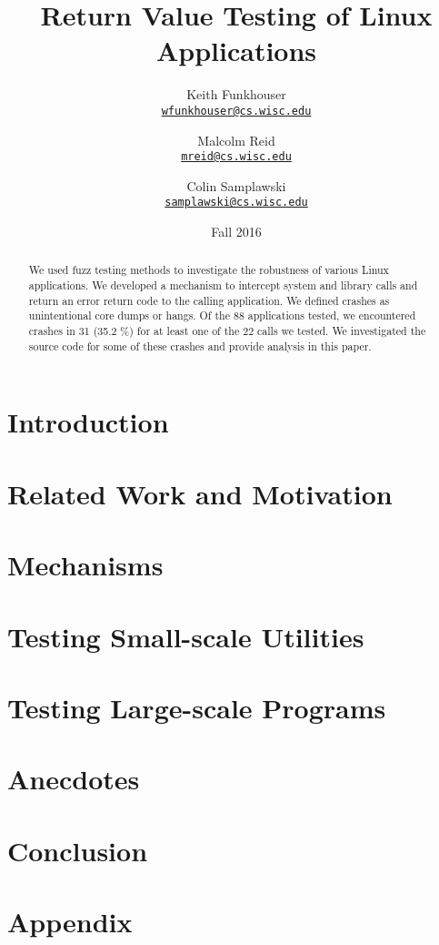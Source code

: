 \documentclass[10pt]{article}
\title{Return Value Testing of Linux Applications}
\author{Keith Funkhouser \\ \texttt{\href{mailto:wfunkhouser@cs.wisc.edu}{wfunkhouser@cs.wisc.edu}}
\and Malcolm Reid\\ \texttt{\href{mailto:mreid@cs.wisc.edu}{mreid@cs.wisc.edu}}
\and Colin Samplawski\\ \texttt{\href{mailto:csamplski@cs.wisc.edu}{samplawski@cs.wisc.edu}}
}
\date{Fall 2016}
\begin{document}
\setlength{\baselineskip}{18pt}
\maketitle

\begin{abstract}
\setlength{\baselineskip}{18pt}
We used fuzz testing methods to investigate the robustness of various Linux applications. We developed a mechanism to intercept system and library calls and return an error return code to the calling application. We defined crashes as unintentional core dumps or hangs. Of the 88 applications tested, we encountered crashes in 31 (35.2 \%) for at least one of the 22 calls we tested. We investigated the source code for some of these crashes and provide analysis in this paper. 
\end{abstract}

\section{Introduction}


\section{Related Work and Motivation}


\section{Mechanisms}




\section{Testing Small-scale Utilities}





\section{Testing Large-scale Programs}


\section{Anecdotes}


\section{Conclusion}




\newpage
\appendix
\section*{Appendix}




\end{document}
